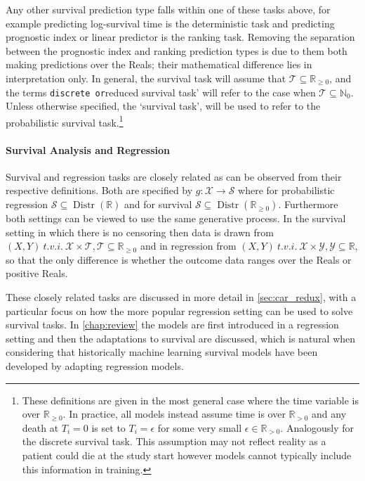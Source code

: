 \documentclass[
  letterpaper,
]{scrbook}
\let\oldparagraph\paragraph
\renewcommand{\paragraph}[1]{\oldparagraph{#1}\mbox{}}
\theoremstyle{plain}
\theoremstyle{definition}
\theoremstyle{remark}
\begin{document}
Any other survival prediction type falls within one of these tasks
above, for example predicting log-survival time is the deterministic
task and predicting prognostic index or linear predictor is the ranking
task. Removing the separation between the prognostic index and ranking
prediction types is due to them both making predictions over the Reals;
their mathematical difference lies in interpretation only. In general,
the survival task will assume that
\(\mathcal{T}\subseteq \mathbb{R}_{\geq 0}\), and the terms
\texttt{discrete\textquotesingle{}\ or}reduced survival task' will refer
to the case when \(\mathcal{T}\subseteq \mathbb{N}_0\). Unless otherwise
specified, the `survival task', will be used to refer to the
probabilistic survival
task.\footnote{These definitions are given in the most general case where the time variable is over $\mathbb{R}_{\geq 0}$. In practice, all models instead assume time is over $\mathbb{R}_{>0}$ and any death at $T_i = 0$ is set to $T_i = \epsilon$ for some very small $\epsilon \in \mathbb{R}_{>0}$. Analogously for the discrete survival task. This assumption may not reflect reality as a patient could die at the study start however models cannot typically include this information in training.}

\paragraph{Survival Analysis and Regression}

Survival and regression tasks are closely related as can be observed
from their respective definitions. Both are specified by
\(g : \mathcal{X}\rightarrow \mathcal{S}\) where for probabilistic
regression \(\mathcal{S}\subseteq \operatorname{Distr}(\mathbb{R})\) and
for survival
\(\mathcal{S}\subseteq \operatorname{Distr}(\mathbb{R}_{\geq 0})\).
Furthermore both settings can be viewed to use the same generative
process. In the survival setting in which there is no censoring then
data is drawn from
\((X,Y) \ t.v.i. \ \mathcal{X}\times \mathcal{T}, \mathcal{T}\subseteq \mathbb{R}_{\geq 0}\)
and in regression from
\((X,Y) \ t.v.i. \ \mathcal{X}\times \mathcal{Y}, \mathcal{Y}\subseteq \mathbb{R}\),
so that the only difference is whether the outcome data ranges over the
Reals or positive Reals.

These closely related tasks are discussed in more detail in
\ref{sec:car_redux}, with a particular focus on how the more popular
regression setting can be used to solve survival tasks. In
\ref{chap:review} the models are first introduced in a regression
setting and then the adaptations to survival are discussed, which is
natural when considering that historically machine learning survival
models have been developed by adapting regression models.
\end{document}
